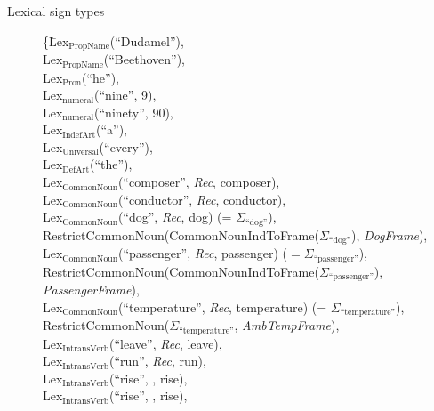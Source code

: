 \begin{description}



\item[Lexical sign types] \mbox{}

\begin{tabbing}
    \{\=Lex$_{\mathrm{PropName}}$(``Dudamel''), \\
    \> Lex$_{\mathrm{PropName}}$(``Beethoven''), \\
    \> Lex$_{\mathrm{Pron}}$(``he''), \\
    \> Lex$_{\mathrm{numeral}}$(``nine'', 9), \\
    \> Lex$_{\mathrm{numeral}}$(``ninety'', 90), \\ 
    \> Lex$_{\mathrm{IndefArt}}$(``a''), \\
    \> Lex$_{\mathrm{Universal}}$(``every''), \\
\> Lex$_{\mathrm{DefArt}}$(``the''),\\
\> Lex$_{\text{CommonNoun}}$(``composer'', \textit{Rec}, composer),\\
\> Lex$_{\text{CommonNoun}}$(``conductor'', \textit{Rec}, conductor), \\
\> Lex$_{\text{CommonNoun}}$(``dog'', \textit{Rec}, dog) (= $\Sigma_{\text{``dog''}}$), \\
\> RestrictCommonNoun(CommonNounIndToFrame($\Sigma_{\text{``dog''}}$),
\textit{DogFrame}),\\
\> Lex$_{\mathrm{CommonNoun}}$(``passenger'', \textit{Rec}, passenger) ($=\Sigma_{\text{``passenger''}}$), \\
\> RestrictCommonNoun(CommonNounIndToFrame($\Sigma_{\text{``passenger''}}$),
\textit{PassengerFrame}), \\
\> Lex$_{\text{CommonNoun}}$(``temperature'', \textit{Rec},
temperature) (= $\Sigma_{\text{``temperature''}}$), \\
\> RestrictCommonNoun($\Sigma_{\text{``temperature''}}$,
\textit{AmbTempFrame}),\\
\> Lex$_{\mathrm{IntransVerb}}$(``leave'', \textit{Rec}, leave), \\
\> Lex$_{\mathrm{IntransVerb}}$(``run'', \textit{Rec}, run), \\
\> Lex$_{\mathrm{IntransVerb}}$(``rise'', ,
rise), \\
\> Lex$_{\mathrm{IntransVerb}}$(``rise'', ,
rise), \\

\end{tabbing}
\end{description}
